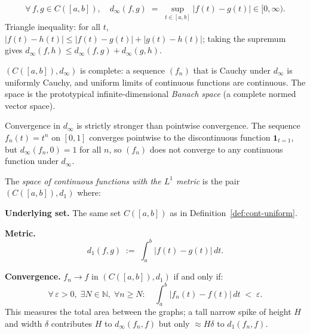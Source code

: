 \begin{remark*}
\[
\forall\, f, g \in C([a,b]), \quad
d_\infty(f,g) \;=\; \sup_{t \in [a,b]}|f(t) - g(t)| \in [0,\infty).
\]
Triangle inequality: for all $t$, $|f(t)-h(t)| \le |f(t)-g(t)| + |g(t)-h(t)|$;
taking the supremum gives $d_\infty(f,h) \le d_\infty(f,g) + d_\infty(g,h)$.
\end{remark*}

\begin{remark*}
$(C([a,b]), d_\infty)$ is complete: a sequence $(f_n)$ that is Cauchy
under $d_\infty$ is uniformly Cauchy, and uniform limits of continuous
functions are continuous.
The space is the prototypical infinite-dimensional \emph{Banach space}
(a complete normed vector space).
\end{remark*}

\begin{remark*}
Convergence in $d_\infty$ is strictly stronger than pointwise convergence.
The sequence $f_n(t) = t^n$ on $[0,1]$ converges pointwise to the
discontinuous function $\mathbf{1}_{t=1}$, but $d_\infty(f_n, 0) = 1$
for all $n$, so $(f_n)$ does not converge to any continuous function
under $d_\infty$.
\end{remark*}


\begin{tcolorbox}[colback=propbox, colframe=propborder, arc=2pt,
  left=6pt, right=6pt, top=4pt, bottom=4pt,
  title={\small\textbf{Definition ($C([a,b])$ with the $L^1$ Metric)}},
  fonttitle=\small\bfseries]
\begin{definition}
\label{def:cont-l1}
The \emph{space of continuous functions with the $L^1$ metric} is the pair
$(C([a,b]), d_1)$ where:

\medskip
\noindent\textbf{Underlying set.}\quad
The same set $C([a,b])$ as in Definition~\ref{def:cont-uniform}.

\medskip
\noindent\textbf{Metric.}
\[
d_1(f,g) \;:=\; \int_a^b |f(t) - g(t)|\,dt.
\]

\medskip
\noindent\textbf{Convergence.}\quad
$f_n \to f$ in $(C([a,b]), d_1)$ if and only if:
\[
\forall\,\varepsilon > 0,\;\exists N \in \mathbb{N},\;
\forall n \ge N:\quad
\int_a^b |f_n(t) - f(t)|\,dt \;<\; \varepsilon.
\]
This measures the total area between the graphs; a tall narrow spike
of height $H$ and width $\delta$ contributes $H$ to $d_\infty(f_n, f)$
but only $\approx H\delta$ to $d_1(f_n, f)$.
\end{definition}
\end{tcolorbox}

